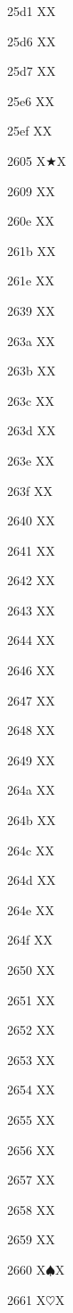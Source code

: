 \documentclass[11pt]{article}
\begin{document}
25d1 X{\RIGHTcircle}X

25d6 X{\LEFTCIRCLE}X

25d7 X{\RIGHTCIRCLE}X

25e6 X{\textopenbullet}X

25ef X{\textbigcircle}X

2605 X{\ensuremath{\bigstar}}X

2609 X{\astrosun}X

260e X{}X

261b X{}X

261e X{}X

2639 X{\frownie}X

263a X{\smiley}X

263b X{\blacksmiley}X

263c X{\sun}X

263d X{\rightmoon}X

263e X{\leftmoon}X

263f X{\mercury}X

2640 X{\venus}X

2641 X{\earth}X

2642 X{\mars}X

2643 X{\jupiter}X

2644 X{\saturn}X

2646 X{\neptune}X

2647 X{\pluto}X

2648 X{\aries}X

2649 X{\taurus}X

264a X{\gemini}X

264b X{\cancer}X

264c X{\leo}X

264d X{\virgo}X

264e X{\libra}X

264f X{\scorpio}X

2650 X{\sagittarius}X

2651 X{\capricornus}X

2652 X{\aquarius}X

2653 X{\pisces}X

2654 X{\symking}X

2655 X{\symqueen}X

2656 X{\symrook}X

2657 X{\symbishop}X

2658 X{\symknight}X

2659 X{\sympawn}X

2660 X{\ensuremath{\spadesuit}}X

2661 X{\ensuremath{\heartsuit}}X
\end{document}
